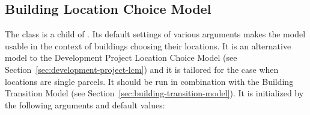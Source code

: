 \subsection{Building Location Choice Model}
\label{sec:BLCM}
%
The class   
is a child of . 
Its default settings
of various arguments makes the model usable in the context of buildings choosing their locations.
It is an alternative model to the Development Project Location Choice Model 
(see Section~\ref{sec:development-project-lcm}) and it is tailored for the case when locations are single parcels.
It should be run in combination with the Building Transition Model (see Section~\ref{sec:building-transition-model}).
It is initialized by the following arguments and default values:
